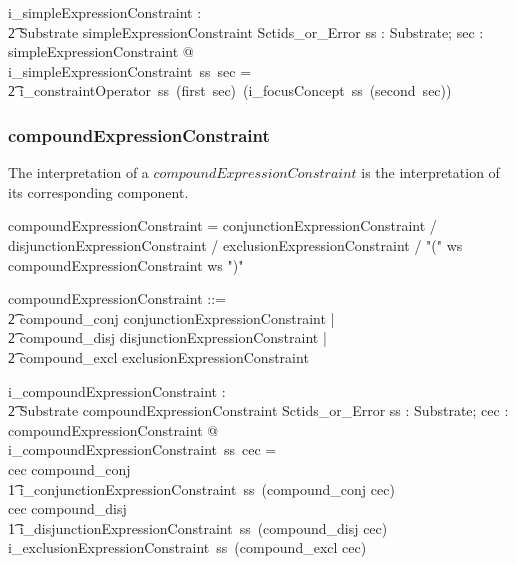 \documentclass{article}
\def\bnf#1{{\scriptsize {{#1}} }}
\begin{document}
\begin{gendef}
   i\_simpleExpressionConstraint : \\
\t2 Substrate \fun simpleExpressionConstraint \fun Sctids\_or\_Error
\where
   \forall ss : Substrate; sec : simpleExpressionConstraint @ \\
i\_simpleExpressionConstraint~ss~sec =  \\
\t2 i\_constraintOperator~ss~(first~sec)~(i\_focusConcept~ss~(second~sec))
\end{gendef}


\subsubsection{compoundExpressionConstraint}
The interpretation of a $compoundExpressionConstraint$ is the interpretation of its corresponding component.
\begin{framed}
\noindent
\bnf{compoundExpressionConstraint = conjunctionExpressionConstraint / 
	disjunctionExpressionConstraint / exclusionExpressionConstraint / 
	"(" ws compoundExpressionConstraint ws ")"}
\end{framed}

\begin{zed}
compoundExpressionConstraint ::= \\
\t2 compound\_conj \ldata conjunctionExpressionConstraint \rdata | \\
\t2 compound\_disj \ldata disjunctionExpressionConstraint \rdata | \\
\t2 compound\_excl \ldata exclusionExpressionConstraint \rdata 
\end{zed}

\begin{gendef}
   i\_compoundExpressionConstraint : \\
\t2 Substrate \fun compoundExpressionConstraint \fun Sctids\_or\_Error
\where
  \forall ss : Substrate; cec : compoundExpressionConstraint @ \\
 i\_compoundExpressionConstraint~ss~cec = \\
   \IF cec \in \ran compound\_conj \\
\t1 \THEN i\_conjunctionExpressionConstraint~ss~(compound\_conj \inv cec) \\
    \ELSE \IF cec \in\ran compound\_disj \\
\t1 \THEN i\_disjunctionExpressionConstraint~ss~(compound\_disj \inv cec) \\
    \ELSE i\_exclusionExpressionConstraint~ss~(compound\_excl \inv cec) 
\end{gendef}
\end{document}
